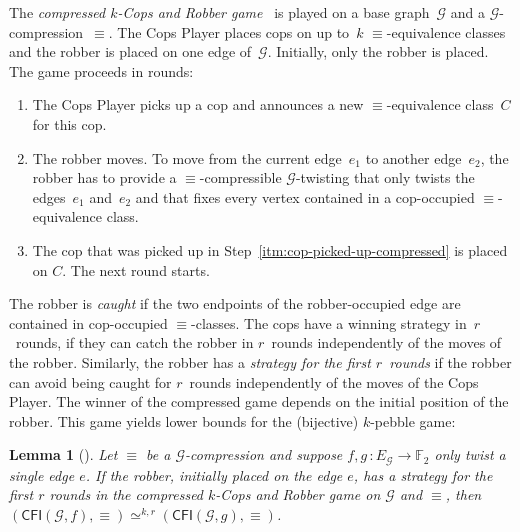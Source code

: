 \documentclass[10pt,a4paper]{article}
\newcommand{\defining}[1]{\emph{#1}}
\newcommand{\comp}{\equiv}
\newcommand{\CFIsym}{\mathsf{CFI}}
\newcommand{\CFI}[1]{\CFIsym(#1)}
\newcommand{\precompCFI}[2]{{(\CFI{#1},#2)}}
\newcommand{\FF}{\mathbb{F}}
\newcommand{\graphG}{\mathcal{G}}
\newcommand{\edgeG}{E_{\graphG}}
\newcommand{\kequivr}[2]{\simeq^{#1,#2}}
\newtheorem{lemma}[theorem]{Lemma}
\begin{document}
\noindent
The \defining{compressed $k$-Cops and Robber game}~\cite{DBLP:conf/focs/GroheLNS23} is played on a base graph~$\graphG$ and a $\graphG$\nobreakdash-com\-pression~$\comp$.
The Cops Player places cops on up to~$k$ $\comp$\nobreakdash-equivalence classes and the robber is placed on one edge of~$\graphG$.
Initially, only the robber is placed. The game proceeds in rounds:
\begin{enumerate}
        \item \label{itm:cop-picked-up-compressed} The Cops Player picks up a cop  and announces a new $\comp$-equivalence class~$C$ for this cop.
        \item The robber moves. To move from the current edge~$e_1$ to another edge~$e_2$, the robber has to provide a $\comp$\nobreakdash-compressible $\graphG$\nobreakdash-twisting
        that only twists the edges~$e_1$ and~$e_2$ and that fixes every vertex contained in a cop-occupied $\comp$\nobreakdash-equivalence class.
        \item  The cop that was picked up in Step~\ref{itm:cop-picked-up-compressed} is placed on $C$. The next round starts.
\end{enumerate}
The robber is \defining{caught} if the two endpoints of the robber-occupied edge are contained in cop-occupied $\comp$\nobreakdash-classes.
The cops have a winning strategy in~$r$~rounds,
if they can catch the robber in $r$~rounds independently of the moves of the robber.
Similarly, the robber has a \defining{strategy for the first  $r$~rounds}
if the robber can avoid being caught for $r$~rounds independently of the moves of the Cops Player.
%
The winner of the compressed game depends on the initial position of the robber.
This game yields lower bounds for the (bijective) $k$-pebble game:
\begin{lemma}[\cite{DBLP:conf/focs/GroheLNS23}]\label{lem:lowerbound-compressed-cops-and-robbers}
        Let $\comp$ be a $\graphG$-compression and 
        suppose $f,g \, \colon \edgeG \to \FF_2$ only twist a single edge $e$.
        If the robber, initially placed on the edge $e$, has a strategy for the first $r$ rounds in the compressed $k$-Cops and Robber game
        on $\graphG$ and $\comp$, then
        $\precompCFI{\graphG,f}{\comp} \kequivr{k}{r} \precompCFI{\graphG,g}{\comp}$.
\end{lemma}
\end{document}
